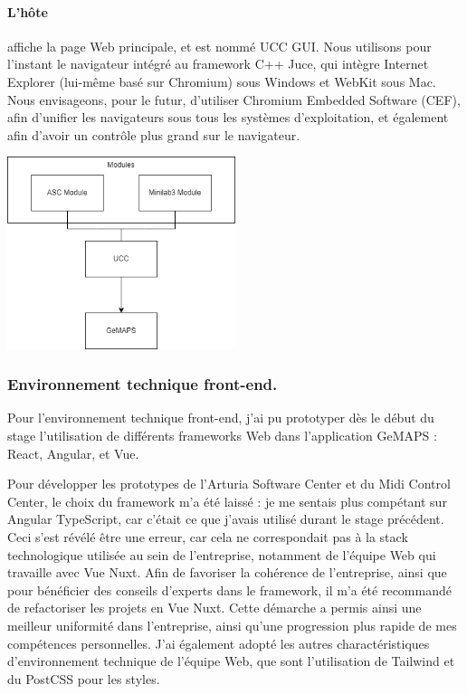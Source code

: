 \documentclass[francais]{rapportPFE}  %
\begin{document}
\paragraph{L'hôte} affiche la page Web principale, et est nommé UCC GUI. Nous utilisons pour l'instant le navigateur intégré au framework C++ Juce, qui intègre Internet Explorer (lui-même basé sur Chromium) sous Windows et WebKit sous Mac. Nous envisageons, pour le futur, d'utiliser Chromium Embedded Software (CEF), afin d'unifier les navigateurs sous tous les systèmes d'exploitation, et également afin d'avoir un contrôle plus grand sur le navigateur. 


\begin{center}
	\centering
	\includegraphics[width=0.5\textwidth]{graphics/gmaps.png}
	\begin{tiny}
	\end{tiny}
	\label{fig}
\end{center}

\subsubsection{Environnement technique front-end.}

Pour l'environnement technique front-end, j'ai pu prototyper dès le début du stage l'utilisation de différents frameworks Web dans l'application GeMAPS : React, Angular, et Vue.  

Pour développer les prototypes de l'Arturia Software Center et du Midi Control Center, le choix du framework m'a été laissé : je me sentais plus compétant sur Angular TypeScript, car c'était ce que j'avais utilisé durant le stage précédent. Ceci s'est révélé être une erreur, car cela ne correspondait pas à la stack technologique utilisée au sein de l'entreprise, notamment de l'équipe Web qui travaille avec Vue Nuxt. Afin de favoriser la cohérence de l'entreprise, ainsi que pour bénéficier des conseils d'experts dans le framework, il m'a été recommandé de refactoriser les projets en Vue Nuxt. Cette démarche a permis ainsi une meilleur uniformité dans l'entreprise, ainsi qu'une progression plus rapide de mes compétences personnelles. J'ai également adopté les autres charactéristiques d'environnement technique de l'équipe Web, que sont l'utilisation de Tailwind et du PostCSS pour les styles. 
\end{document}
